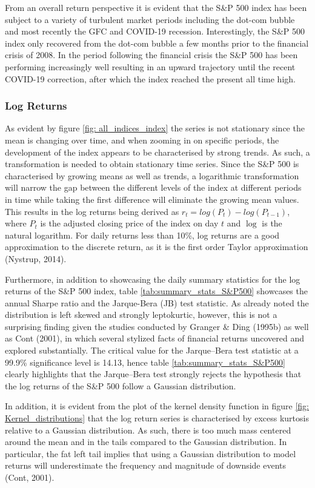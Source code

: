 From an overall return perspective it is evident that the S\&P 500 index has been subject to a variety of turbulent market periods including the dot-com bubble and most recently the GFC and COVID-19 recession. Interestingly, the S\&P 500 index only recovered from the dot-com bubble a few months prior to the financial crisis of 2008. In the period following the financial crisis the S\&P 500 has been performing increasingly well resulting in an upward trajectory until the recent COVID-19 correction, after which the index reached the present all time high. 

\subsubsection{Log Returns}
As evident by figure \ref{fig: all_indices_index} the series is not stationary since the mean is changing over time, and when zooming in on specific periods, the development of the index appears to be characterised by strong trends. As such, a transformation is needed to obtain stationary time series. Since the S\&P 500 is characterised by growing means as well as trends, a logarithmic transformation will narrow the gap between the different levels of the index at different periods in time while taking the first difference will eliminate the growing mean values. This results in the log returns being derived as $r_t = log(P_t) - log(P_{t-1})$, where $P_t$ is the adjusted closing price of the index on day $t$ and $\log$ is the natural logarithm. For daily returns less than 10\%, log returns are a good approximation to the discrete return, as it is the first order Taylor approximation (Nystrup, 2014).

Furthermore, in addition to showcasing the daily summary statistics for the log returns of the S\&P 500 index, table \ref{tab:summary_stats_S&P500} showcases the annual Sharpe ratio and the Jarque-Bera (JB) test statistic. As already noted the distribution is left skewed and strongly leptokurtic, however, this is not a surprising finding given the studies conducted by Granger \& Ding (1995b) as well as Cont (2001), in which several stylized facts of financial returns uncovered and explored substantially. The critical value for the Jarque–Bera test statistic at a 99.9\% significance level is 14.13, hence table \ref{tab:summary_stats_S&P500} clearly highlights that the Jarque–Bera test strongly rejects the hypothesis that the log returns of the S\&P 500 follow a Gaussian distribution.  

In addition, it is evident from the plot of the kernel density function in figure \ref{fig: Kernel_distributions} that the log return series is characterised by excess kurtosis relative to a Gaussian distribution. As such, there is too much mass centered around the mean and in the tails compared to the Gaussian distribution. In particular, the fat left tail implies that using a Gaussian distribution to model returns will underestimate the frequency and magnitude of downside events (Cont, 2001). 

